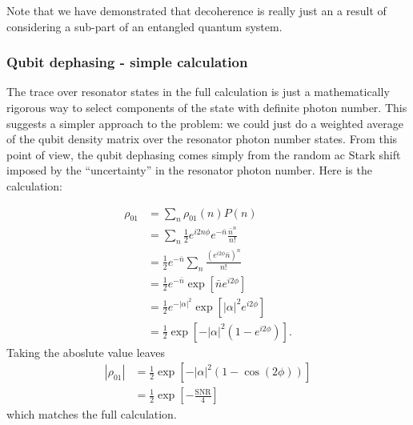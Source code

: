Note that we have demonstrated that decoherence is really just an a result of considering a sub-part of an entangled quantum system.


\subsubsection{Qubit dephasing - simple calculation}

The trace over resonator states in the full calculation is just a mathematically rigorous way to select components of the state with definite photon number.
This suggests a simpler approach to the problem: we could just do a weighted average of the qubit density matrix over the resonator photon number states.
From this point of view, the qubit dephasing comes simply from the random ac Stark shift imposed by the ``uncertainty'' in the resonator photon number.
Here is the calculation:

\begin{align}
\rho_{01}
&= \sum_n \rho_{01}(n) P(n) \\
&= \sum_n \frac{1}{2} e^{i 2 n \phi} e^{-\bar{n}} \frac{\bar{n}^n}{n!} \\
&= \frac{1}{2} e^{-\bar{n}} \sum_n \frac{\left( e^{i 2 \phi}\bar{n}\right)^n}{n!} \\
&= \frac{1}{2} e^{-\bar{n}} \exp \left[ \bar{n} e^{i 2 \phi} \right] \\
&= \frac{1}{2} e^{-|\alpha|^2} \exp \left[ |\alpha|^2 e^{i 2 \phi} \right] \\
&= \frac{1}{2} \exp \left[ -|\alpha|^2 \left( 1 - e^{i 2 \phi} \right) \right] . \end{align}
Taking the aboslute value leaves \begin{align}
|\rho_{01}|
&= \frac{1}{2} \exp \left[ -|\alpha|^2 \left( 1 - \cos\left(2 \phi \right) \right) \right] \\
&= \frac{1}{2} \exp \left[ - \frac{\text{SNR}}{4} \right]  \end{align}
which matches the full calculation.
